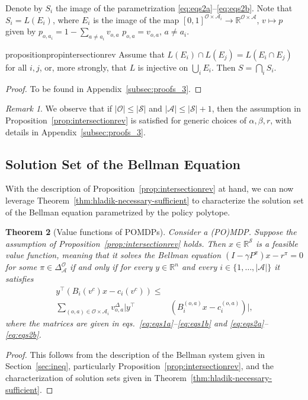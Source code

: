 \documentclass{article}
\newtheorem{theorem}{Theorem}[section]
\theoremstyle{definition}
\theoremstyle{remark}
\newtheorem{remark}[theorem]{Remark}
\begin{document}
Denote by $S_i$ the image of the parametrization \eqref{eq:eqs2a}--\eqref{eq:eqs2b}. 
%
Note that $S_i = L(E_i)$, where $E_i$ is the image of the map $[0,1]^{\mathcal{O}\times\mathcal{A}_i}\to \mathbb{R}^{\mathcal{O}\times\mathcal{A}}$, $v\mapsto p$ given by $p_{o,a_i}=1-\sum_{a\neq a_i}v_{o,a}$ $p_{o,a}=v_{o,a}$, $a\neq a_i$. 

\begin{restatable}{proposition}{propintersectionrev}
\label{prop:intersectionrev}
Assume that
$
L(E_i)\cap L(E_j)=L(E_i\cap E_j)$ for all $i,j$, 
or, more strongly, that \(L\) is injective on \(\bigcup_i E_i\). 
Then
$S=\bigcap_i S_i$.
\end{restatable} 

\begin{proof}
    To be found in Appendix~\ref{subsec:proofs_3}.
\end{proof} 

\begin{remark} 
We observe that if $\vert \mathcal O\vert \leq \vert \mathcal S\vert $ and $\vert \mathcal A\vert \leq \vert \mathcal S\vert +1$, then the assumption in Proposition~\ref{prop:intersectionrev} is satisfied for generic choices of $\alpha,\beta,r$, with details in Appendix~\ref{subsec:proofs_3}. 
\end{remark} 

\subsection{Solution Set of the Bellman Equation}  

With the description of Proposition~\ref{prop:intersectionrev} at hand, we can now leverage Theorem~\ref{thm:hladik-necessary-sufficient} to characterize the solution set of the Bellman equation parametrized by the policy polytope. 

\begin{theorem}[Value functions of POMDPs]
\label{thm:value_functions}
Consider a (PO)MDP. Suppose the assumption of Proposition~\ref{prop:intersectionrev} holds. 
Then $x\in\mathbb{R}^\mathcal{S}$ is a feasible value function, meaning that it solves the Bellman equation $(I-\gamma P^\pi)x - r^\pi=0$ for some $\pi\in\Delta^\mathcal{O}_\mathcal{A}$ if and only if for every $y\in\mathbb{R}^n$ and every $i\in\{1,\ldots, \vert \mathcal{A}\vert \}$ 
it satisfies 
%
\begin{align*}
    y^\top (B_i(v^c)x -c_i(v^c)) \leq& \\
    \sum_{(o,a)\in\mathcal{O}\times\mathcal{A}_i} v_{o,a}^\Delta \vert y^\top &(B_i^{(o,a)} x - c_i^{(o,a)})\vert   , 
\end{align*}
%
where the matrices are given in eqs.~\ref{eq:eqs1a}--\ref{eq:eqs1b} and \ref{eq:eqs2a}--\ref{eq:eqs2b}. 
\end{theorem}
\begin{proof}

This follows from the description of the Bellman system given in Section~\ref{sec:ineq}, particularly Proposition~\ref{prop:intersectionrev}, and the characterization of solution sets given in Theorem~\ref{thm:hladik-necessary-sufficient}. 
\end{proof}
\end{document}
